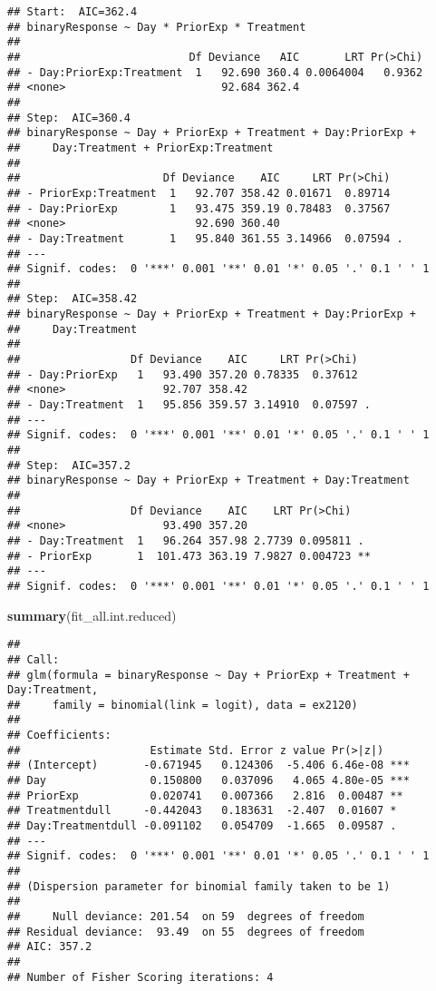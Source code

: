 \documentclass[
]{article}
\newenvironment{Shaded}{\begin{snugshade}}{\end{snugshade}}
\newcommand{\FunctionTok}[1]{\textcolor[rgb]{0.13,0.29,0.53}{\textbf{#1}}}
\newcommand{\NormalTok}[1]{#1}
\begin{document}
\begin{verbatim}
## Start:  AIC=362.4
## binaryResponse ~ Day * PriorExp * Treatment
## 
##                          Df Deviance   AIC       LRT Pr(>Chi)
## - Day:PriorExp:Treatment  1   92.690 360.4 0.0064004   0.9362
## <none>                        92.684 362.4                   
## 
## Step:  AIC=360.4
## binaryResponse ~ Day + PriorExp + Treatment + Day:PriorExp + 
##     Day:Treatment + PriorExp:Treatment
## 
##                      Df Deviance    AIC     LRT Pr(>Chi)  
## - PriorExp:Treatment  1   92.707 358.42 0.01671  0.89714  
## - Day:PriorExp        1   93.475 359.19 0.78483  0.37567  
## <none>                    92.690 360.40                   
## - Day:Treatment       1   95.840 361.55 3.14966  0.07594 .
## ---
## Signif. codes:  0 '***' 0.001 '**' 0.01 '*' 0.05 '.' 0.1 ' ' 1
## 
## Step:  AIC=358.42
## binaryResponse ~ Day + PriorExp + Treatment + Day:PriorExp + 
##     Day:Treatment
## 
##                 Df Deviance    AIC     LRT Pr(>Chi)  
## - Day:PriorExp   1   93.490 357.20 0.78335  0.37612  
## <none>               92.707 358.42                   
## - Day:Treatment  1   95.856 359.57 3.14910  0.07597 .
## ---
## Signif. codes:  0 '***' 0.001 '**' 0.01 '*' 0.05 '.' 0.1 ' ' 1
## 
## Step:  AIC=357.2
## binaryResponse ~ Day + PriorExp + Treatment + Day:Treatment
## 
##                 Df Deviance    AIC    LRT Pr(>Chi)   
## <none>               93.490 357.20                   
## - Day:Treatment  1   96.264 357.98 2.7739 0.095811 . 
## - PriorExp       1  101.473 363.19 7.9827 0.004723 **
## ---
## Signif. codes:  0 '***' 0.001 '**' 0.01 '*' 0.05 '.' 0.1 ' ' 1
\end{verbatim}

\begin{Shaded}
\begin{Highlighting}[]
\FunctionTok{summary}\NormalTok{(fit\_all.int.reduced)}
\end{Highlighting}
\end{Shaded}

\begin{verbatim}
## 
## Call:
## glm(formula = binaryResponse ~ Day + PriorExp + Treatment + Day:Treatment, 
##     family = binomial(link = logit), data = ex2120)
## 
## Coefficients:
##                    Estimate Std. Error z value Pr(>|z|)    
## (Intercept)       -0.671945   0.124306  -5.406 6.46e-08 ***
## Day                0.150800   0.037096   4.065 4.80e-05 ***
## PriorExp           0.020741   0.007366   2.816  0.00487 ** 
## Treatmentdull     -0.442043   0.183631  -2.407  0.01607 *  
## Day:Treatmentdull -0.091102   0.054709  -1.665  0.09587 .  
## ---
## Signif. codes:  0 '***' 0.001 '**' 0.01 '*' 0.05 '.' 0.1 ' ' 1
## 
## (Dispersion parameter for binomial family taken to be 1)
## 
##     Null deviance: 201.54  on 59  degrees of freedom
## Residual deviance:  93.49  on 55  degrees of freedom
## AIC: 357.2
## 
## Number of Fisher Scoring iterations: 4
\end{verbatim}
\end{document}
